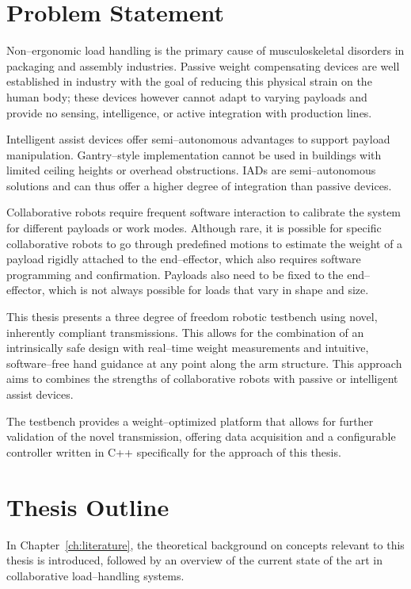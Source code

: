 \documentclass[11pt,a4paper,twoside,openright]{book}
\begin{document}
\newpage

\section{Problem Statement}

Non--ergonomic load handling is the primary cause of musculoskeletal disorders in packaging and assembly industries. Passive weight compensating devices are well established in industry with the goal of reducing this physical strain on the human body; these devices however cannot adapt to varying payloads and provide no sensing, intelligence, or active integration with production lines.

Intelligent assist devices offer semi--autonomous advantages to support payload manipulation. Gantry--style implementation cannot be used in buildings with limited ceiling heights or overhead obstructions. IADs are semi--autonomous solutions and can thus offer a higher degree of integration than passive devices.

Collaborative robots require frequent software interaction to calibrate the system for different payloads or work modes. Although rare, it is possible for specific collaborative robots to go through predefined motions to estimate the weight of a payload rigidly attached to the end--effector, which also requires software programming and confirmation. Payloads also need to be fixed to the end--effector, which is not always possible for loads that vary in shape and size.

This thesis presents a three degree of freedom robotic testbench using novel, inherently compliant transmissions. This allows for the combination of an intrinsically safe design with real--time weight measurements and intuitive, software--free hand guidance at any point along the arm structure. This approach aims to combines the strengths of collaborative robots with passive or intelligent assist devices.

The testbench provides a weight--optimized platform that allows for further validation of the novel transmission, offering data acquisition and a configurable controller written in C++ specifically for the approach of this thesis. 
\section{Thesis Outline}

In Chapter~\ref{ch:literature}, the theoretical background on concepts relevant to this thesis is introduced, followed by an overview of the current state of the art in collaborative load--handling systems.\\
\end{document}
